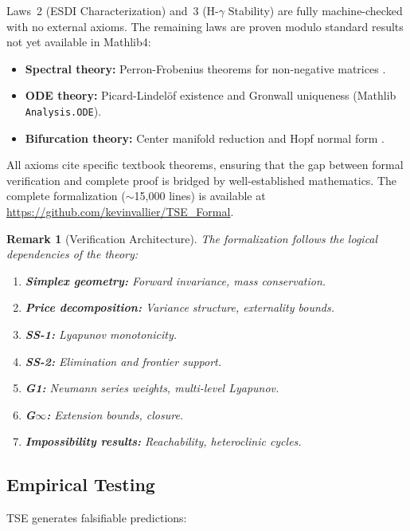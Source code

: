 \documentclass[12pt]{article}
\newtheorem{remark}{Remark}[section]
\begin{document}
Laws~2 (ESDI Characterization) and~3 (H-$\gamma$ Stability) are fully machine-checked with no external axioms. The remaining laws are proven modulo standard results not yet available in Mathlib4:
\begin{itemize}
    \item \textbf{Spectral theory:} Perron-Frobenius theorems for non-negative matrices \citep{horn2012matrix}.
    \item \textbf{ODE theory:} Picard-Lindel\"of existence and Gronwall uniqueness (Mathlib \texttt{Analysis.ODE}).
    \item \textbf{Bifurcation theory:} Center manifold reduction and Hopf normal form \citep{guckenheimer1983nonlinear}.
\end{itemize}
All axioms cite specific textbook theorems, ensuring that the gap between formal verification and complete proof is bridged by well-established mathematics. The complete formalization ($\sim$15,000 lines) is available at \url{https://github.com/kevinvallier/TSE_Formal}.

\begin{remark}[Verification Architecture]
The formalization follows the logical dependencies of the theory:
\begin{enumerate}
    \item \textbf{Simplex geometry:} Forward invariance, mass conservation.
    \item \textbf{Price decomposition:} Variance structure, externality bounds.
    \item \textbf{SS-1:} Lyapunov monotonicity.
    \item \textbf{SS-2:} Elimination and frontier support.
    \item \textbf{G1:} Neumann series weights, multi-level Lyapunov.
    \item \textbf{G$\infty$:} Extension bounds, closure.
    \item \textbf{Impossibility results:} Reachability, heteroclinic cycles.
\end{enumerate}
\end{remark}

\subsection{Empirical Testing}

TSE generates falsifiable predictions:
\end{document}
